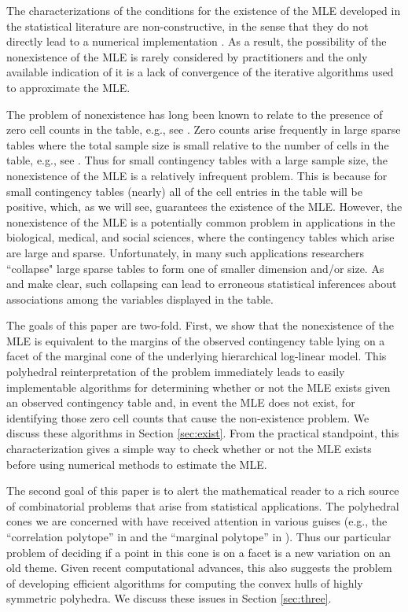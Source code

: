 \documentclass{elsart}
\begin{document}
The characterizations of the conditions for the existence of the MLE
developed in the statistical literature are non-constructive, in the
sense that they do not directly lead to a numerical implementation
\cite[see][Appendix~B]{HAB74}.   As a result, the possibility of
the nonexistence of the MLE is rarely considered by practitioners and the
only available indication of it is a lack of convergence of the iterative
algorithms used to approximate the MLE.  

The problem of nonexistence has long been known to relate to the
presence of zero cell counts in the table, e.g., see  \cite{FIE70,HAB74,BFH75}.  
Zero counts arise frequently in large
sparse tables where the total sample size is small relative to the
number of cells in the table, e.g., see \cite{KOE86}.   Thus for small
contingency tables with a large sample size, the nonexistence 
of the MLE is a relatively infrequent problem.  This is because
for small contingency tables (nearly) all of the cell entries in the table
will be positive, which, as we will see, guarantees the existence of
the MLE.  However, the nonexistence of the MLE is a potentially
common problem in applications in the biological, medical, and social
sciences, where the 
contingency tables which arise are large and sparse.  Unfortunately,
in many such applications researchers ``collapse" large sparse tables
to form one of smaller dimension and/or size.  As \cite{BFH75} and
\cite{LAU96} make clear, such collapsing can lead to erroneous
statistical inferences about associations among the variables
displayed in the table. 

The goals of this paper are two-fold. First, we show that the 
nonexistence of the MLE is equivalent to the
margins of the observed contingency table lying on a facet of the
marginal cone of the  underlying hierarchical log-linear model.  
This polyhedral reinterpretation of
the problem immediately leads to easily implementable algorithms for
determining whether or not the MLE exists given an observed
contingency table and, in event the MLE does not exist, for
identifying those zero cell counts that cause the non-existence
problem.  We discuss these algorithms in Section 
\ref{sec:exist}.  From the practical standpoint, this characterization
gives a simple 
way to check whether or not the MLE exists before using  numerical
methods to estimate the MLE. 

The second goal of this paper is to alert the mathematical reader to a
rich source of combinatorial problems that arise from statistical
applications.  The polyhedral cones we are concerned with have
received attention in various guises (e.g., the ``correlation
polytope'' in \citet{deza-laurent} and the ``marginal polytope'' in
\citet{wainwright}).   Thus our particular problem of
deciding if a point in this cone is on a facet is a new variation on an
old theme.  Given recent computational advances, this also suggests
the problem of developing efficient algorithms for computing the
convex hulls of highly symmetric polyhedra.  We discuss these issues 
in Section \ref{sec:three}.
\end{document}
